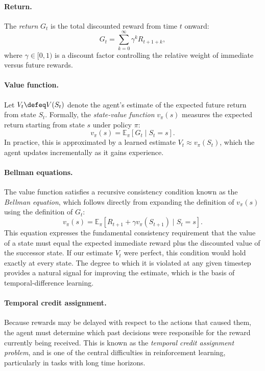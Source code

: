 \paragraph{Return.}
The \emph{return} $G_t$ is the total discounted reward from time $t$ onward:
\begin{equation}
    G_t = \sum_{k=0}^{\infty} \gamma^k R_{t+1+k},
\end{equation}
where $\gamma \in [0,1)$ is a discount factor controlling the relative weight
of immediate versus future rewards.

\paragraph{Value function.}
Let $V_t \defeq V(S_t)$ denote the agent's estimate of the expected future
return from state $S_t$. Formally, the \emph{state-value function}
$v_\pi(s)$ measures the expected return starting from state $s$ under
policy $\pi$:
\begin{equation}
    v_\pi(s) = \mathbb{E}_\pi \left[ G_t \mid S_t = s \right].
\end{equation}
In practice, this is approximated by a learned estimate $V_t \approx
v_\pi(S_t)$, which the agent updates incrementally as it gains experience.

\paragraph{Bellman equations.}
The value function satisfies a recursive consistency condition known as the
\emph{Bellman equation}, which follows directly from expanding the definition
of $v_\pi(s)$ using the definition of $G_t$:
\begin{equation}
    v_\pi(s) = \mathbb{E}_\pi \left[ R_{t+1} + \gamma v_\pi(S_{t+1}) \mid S_t = s \right].
\end{equation}
This equation expresses the fundamental consistency requirement that the value of
a state must equal the expected immediate reward plus the discounted value
of the successor state. If our estimate $V_t$ were perfect, this condition
would hold exactly at every state. The degree to which it is violated at
any given timestep provides a natural signal for improving the estimate,
which is the basis of temporal-difference learning.

\paragraph{Temporal credit assignment.}
Because rewards may be delayed with respect to the actions that caused them,
the agent must determine which past decisions were responsible for the reward
currently being received. This is known as the \emph{temporal credit
assignment problem}, and is one of the central difficulties in reinforcement
learning, particularly in tasks with long time horizons.

